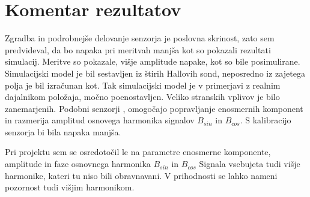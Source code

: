 \section{Komentar rezultatov}
Zgradba in podrobnejše delovanje senzorja je poslovna skrinost, zato sem predvideval, da bo napaka pri meritvah manjša kot so pokazali rezultati simulacij. Meritve so pokazale, višje amplitude napake, kot so bile posimulirane.  Simulacijski model je bil sestavljen iz štirih Hallovih sond, neposredno iz zajetega polja je bil izračunan kot. Tak simulacijski model je v primerjavi z realnim dajalnikom položaja, močno poenostavljen. Veliko stranskih vplivov je bilo zanemarjenih. 
Podobni senzorji \cite{iCMHM}, omogočajo popravljanje enosmernih komponent in razmerija amplitud osnovega harmonika signalov  $B_{sin}$ in $B_{cos}$. S kalibracijo senzorja bi bila napaka manjša.

Pri projektu sem se osredotočil le na parametre enosmerne komponente, amplitude in faze osnovnega harmonika  $B_{sin}$ in $B_{cos}$ Signala vsebujeta tudi višje harmonike, kateri tu niso bili obravnavani. V prihodnosti se lahko nameni pozornost tudi višjim harmonikom.



